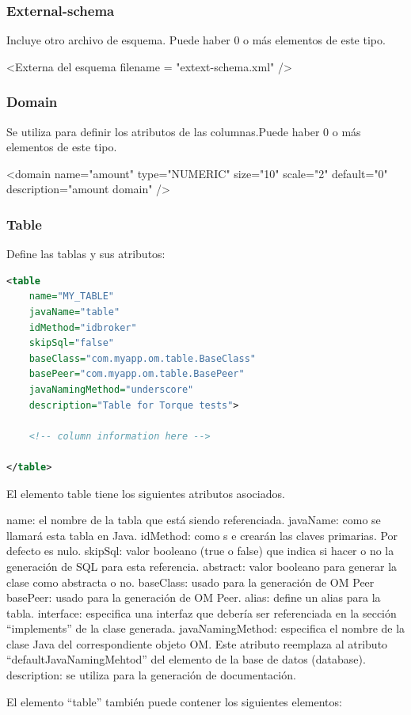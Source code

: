 \documentclass[24pt, a4paper, oneside, spanish]{beamer}
\begin{document}
		\begin{frame}
			\frametitle{External-schema}
			
			Incluye otro archivo de esquema. Puede haber 0 o más elementos de este tipo.

<Externa del esquema
           		filename = "extext-schema.xml" />
		\end{frame}
		
		\begin{frame}
			\frametitle{Domain}
			\setbeamercovered{invisible}
			
			Se utiliza para definir los atributos de las columnas.Puede haber 0 o más elementos de este tipo. 

<domain
           name="amount"
           type="NUMERIC"
           size="10"
           scale="2"
           default="0"
           description="amount domain" />
		\end{frame}

			\begin{frame}
				\frametitle{Table}
				
				Define las tablas y sus atributos:

\begin{lstlisting}[language=XML]
<table
	name="MY_TABLE"
	javaName="table"
	idMethod="idbroker"
	skipSql="false"
	baseClass="com.myapp.om.table.BaseClass"
	basePeer="com.myapp.om.table.BasePeer"
	javaNamingMethod="underscore"
	description="Table for Torque tests">

	<!-- column information here -->

</table>
\end{lstlisting}

El elemento table tiene los siguientes atributos asociados.

name: el nombre de la tabla que está siendo referenciada.
javaName: como se llamará esta tabla en Java.
idMethod: como s e crearán las claves primarias. Por defecto es nulo.
skipSql: valor booleano (true o false) que indica si hacer o no la generación de SQL para esta referencia.
abstract: valor booleano para generar la clase como abstracta o no.
baseClass: usado para la generación de OM Peer
basePeer: usado para la generación de OM Peer.
alias: define un alias para la tabla.
interface: especifica una interfaz que debería ser referenciada en la sección “implements” de la clase generada.
javaNamingMethod: especifica el nombre de la clase Java del correspondiente objeto OM. Este atributo reemplaza al atributo “defaultJavaNamingMehtod” del elemento de la base de datos (database).
description: se utiliza para la generación de documentación.

El elemento “table” también puede contener los siguientes elementos:
			\end{frame}
			
\end{document}

